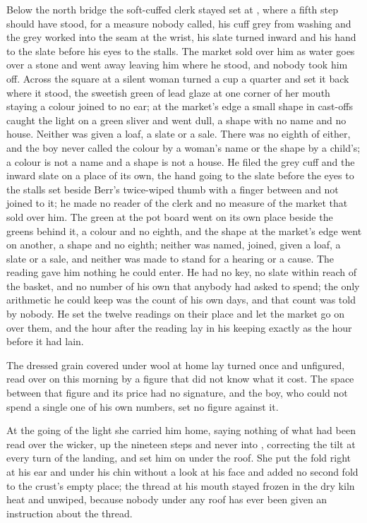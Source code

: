 Below the north bridge the soft-cuffed clerk stayed set at , where a fifth step should have stood, for a measure nobody called, his cuff grey from washing and the grey worked into the seam at the wrist, his slate turned inward and his hand to the slate before his eyes to the stalls. The market sold over him as water goes over a stone and went away leaving him where he stood, and nobody took him off. Across the square at  a silent woman turned a cup a quarter and set it back where it stood, the sweetish green of lead glaze at one corner of her mouth staying a colour joined to no ear; at the market's edge a small shape in cast-offs caught the light on a green sliver and went dull, a shape with no name and no house. Neither was given a loaf, a slate or a sale. There was no eighth of either, and the boy never called the colour by a woman's name or the shape by a child's; a colour is not a name and a shape is not a house. He filed the grey cuff and the inward slate on a place of its own, the hand going to the slate before the eyes to the stalls set beside Berr's twice-wiped thumb with a finger between and not joined to it; he made no reader of the clerk and no measure of the market that sold over him. The green at the pot board went on its own place beside the greens behind it, a colour and no eighth, and the shape at the market's edge went on another, a shape and no eighth; neither was named, joined, given a loaf, a slate or a sale, and neither was made to stand for a hearing or a cause. The reading gave him nothing he could enter. He had no key, no slate within reach of the basket, and no number of his own that anybody had asked to spend; the only arithmetic he could keep was the count of his own days, and that count was told by nobody. He set the twelve readings on their place and let the market go on over them, and the hour after the reading lay in his keeping exactly as the hour before it had lain.

The dressed grain covered under wool at home lay turned once and unfigured, read over on this morning by a figure that did not know what it cost. The space between that figure and its price had no signature, and the boy, who could not spend a single one of his own numbers, set no figure against it.

At the going of the light she carried him home, saying nothing of what had been read over the wicker, up the nineteen steps and never into , correcting the tilt at every turn of the landing, and set him on  under the roof. She put the fold right at his ear and under his chin without a look at his face and added no second fold to the crust's empty place; the thread at his mouth stayed frozen in the dry kiln heat and unwiped, because nobody under any roof has ever been given an instruction about the thread.

